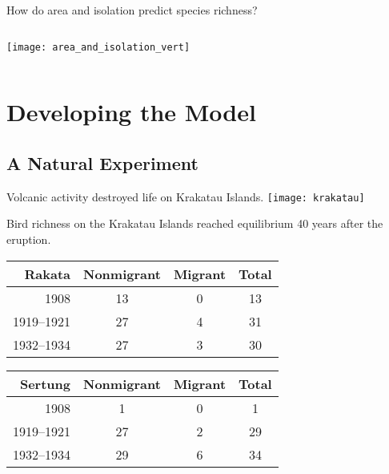 \documentclass[xcolor=svgnames]{beamer}
\begin{document}
\begin{frame}{How do area and isolation predict species richness?}
	\begin{columns}[T]
		\begin{column}{0.5\textwidth}
			\centering
			\texttt{[image: area\_and\_isolation\_vert]}\\
		\end{column}
		\begin{column}{0.5\textwidth}
		\end{column}		
	\end{columns}
\end{frame}

\section{Developing the Model}
\subsection{A Natural Experiment}

\begin{frame}{Volcanic activity destroyed life on Krakatau Islands.}
	\centering
		\texttt{[image: krakatau]}
\end{frame}

\begin{frame}{Bird richness on the Krakatau Islands reached equilibrium 40 years after the eruption.}
	\centering
	\begin{tabular}{rccc}
		\toprule
		\textbf{Rakata} & Nonmigrant & Migrant & Total\\
		\midrule
		1908 & 13 & 0 & 13 \\
		1919--1921 & 27 & 4 & 31 \\
		1932--1934 & 27 & 3 & 30 \\
		\bottomrule
	\end{tabular}
	
	\vspace{1\baselineskip}
	
	\begin{tabular}{rccc}
		\toprule
		\textbf{Sertung}& Nonmigrant & Migrant & Total\\
		\midrule
		1908 & 1 & 0 & 1 \\
		1919--1921 & 27 & 2 & 29\\
		1932--1934 & 29 & 6 & 34\\
		\bottomrule
	\end{tabular}
\end{frame}
\end{document}
